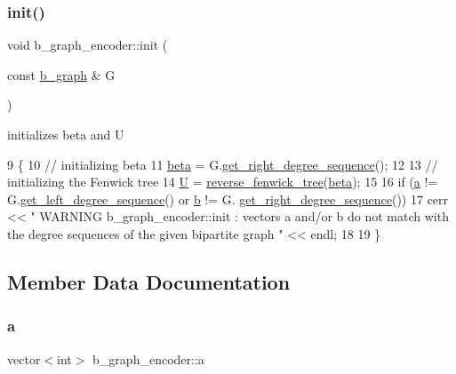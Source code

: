 \subsubsection{\texorpdfstring{init()}{init()}}
{\footnotesize\ttfamily void b\+\_\+graph\+\_\+encoder\+::init (\begin{DoxyParamCaption}\item[{const \hyperlink{classb__graph}{b\+\_\+graph} \&}]{G }\end{DoxyParamCaption})}



initializes beta and U 


\begin{DoxyCode}
9 \{
10   \textcolor{comment}{// initializing beta}
11   \hyperlink{classb__graph__encoder_ae54d76cc4cee399d98951f870897a144}{beta} = G.\hyperlink{classb__graph_a2711566385b92b02f4c03abdc1f9a582}{get\_right\_degree\_sequence}();
12 
13   \textcolor{comment}{// initializing the Fenwick tree}
14   \hyperlink{classb__graph__encoder_ac810138443002a2b2cf579ced2dc34ce}{U} = \hyperlink{classreverse__fenwick__tree}{reverse\_fenwick\_tree}(\hyperlink{classb__graph__encoder_ae54d76cc4cee399d98951f870897a144}{beta});
15 
16   \textcolor{keywordflow}{if} (\hyperlink{classb__graph__encoder_afd22d167f495cd85b41397f337c377c2}{a} != G.\hyperlink{classb__graph_afd65fb655f7e24217393a10533b87d3c}{get\_left\_degree\_sequence}() or \hyperlink{classb__graph__encoder_a767826e268702e45ab71565e096a52b8}{b} != G.
      \hyperlink{classb__graph_a2711566385b92b02f4c03abdc1f9a582}{get\_right\_degree\_sequence}())
17     cerr << \textcolor{stringliteral}{" WARNING b\_graph\_encoder::init : vectors a and/or b do not match with the degree sequences of
       the given bipartite graph  "} << endl;
18 
19 \}
\end{DoxyCode}


\subsection{Member Data Documentation}
\mbox{\label{classb__graph__encoder_afd22d167f495cd85b41397f337c377c2}} 
\subsubsection{\texorpdfstring{a}{a}}
{\footnotesize\ttfamily vector$<$int$>$ b\+\_\+graph\+\_\+encoder\+::a\hspace{0.3cm}{\ttfamily [private]}}



